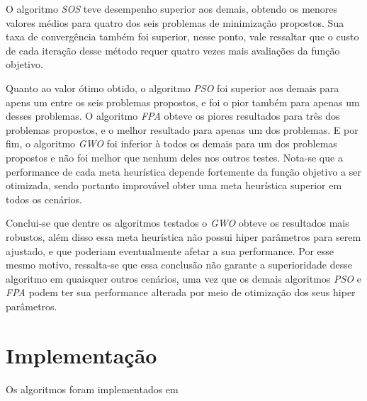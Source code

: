 \documentclass[a4paper, 11pt]{article}
\begin{document}
O algoritmo  \textit{SOS} teve desempenho superior aos demais, obtendo os menores valores médios para quatro dos seis problemas de minimização propostos. Sua taxa de convergência também foi superior, nesse ponto, vale ressaltar que o custo de cada iteração desse método requer quatro vezes mais avaliações da função objetivo. 

Quanto ao valor ótimo obtido, o algoritmo \textit{PSO} foi superior aos demais para apens um entre os seis problemas propostos, e foi o pior também para apenas um desses problemas. O algoritmo \textit{FPA} obteve os piores resultados para três dos problemas propostos, e o melhor resultado para apenas um dos problemas. E por fim, o algoritmo \textit{GWO} foi inferior à todos os demais para um dos problemas propostos e não foi melhor que nenhum deles nos outros testes. Nota-se que a performance de cada meta heurística depende fortemente da função objetivo a ser otimizada, sendo portanto improvável obter uma meta heurística superior em todos os cenários.

Conclui-se que dentre os algoritmos testados o \textit{GWO} obteve os resultados mais robustos, além disso essa meta heurística não possui hiper parâmetros para serem ajustado, e que poderiam eventualmente afetar a sua performance. Por esse mesmo motivo, ressalta-se que essa conclusão não garante a superioridade desse algoritmo em quaisquer outros cenários, uma vez que os demais algoritmos \textit{PSO} e \textit{FPA} podem ter sua performance alterada por meio de otimização dos seus hiper parâmetros. 
 
 \appendix

\section{Implementação}

Os algoritmos foram implementados em  

\end{document}
